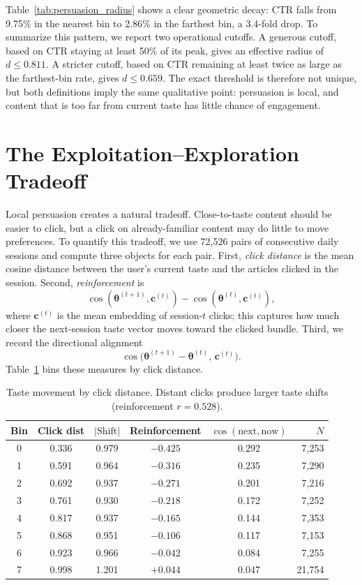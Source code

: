 \documentclass[11pt]{article}
\begin{document}
Table~\ref{tab:persuasion_radius} shows a clear geometric decay: CTR falls from 9.75\% in the nearest bin to 2.86\% in the farthest bin, a 3.4-fold drop. To summarize this pattern, we report two operational cutoffs. A generous cutoff, based on CTR staying at least 50\% of its peak, gives an effective radius of $d \leq 0.811$. A stricter cutoff, based on CTR remaining at least twice as large as the farthest-bin rate, gives $d \leq 0.659$. The exact threshold is therefore not unique, but both definitions imply the same qualitative point: persuasion is local, and content that is too far from current taste has little chance of engagement.

\section{The Exploitation--Exploration Tradeoff}
\label{sec:tradeoff}

Local persuasion creates a natural tradeoff. Close-to-taste content should be easier to click, but a click on already-familiar content may do little to move preferences. To quantify this tradeoff, we use 72,526 pairs of consecutive daily sessions and compute three objects for each pair. First, \emph{click distance} is the mean cosine distance between the user's current taste and the articles clicked in the session. Second, \emph{reinforcement} is
\[
\cos(\boldsymbol{\theta}^{(t+1)},\mathbf{c}^{(t)})-\cos(\boldsymbol{\theta}^{(t)},\mathbf{c}^{(t)}),
\]
where $\mathbf{c}^{(t)}$ is the mean embedding of session-$t$ clicks; this captures how much closer the next-session taste vector moves toward the clicked bundle. Third, we record the directional alignment
\[
\cos\!\big(\boldsymbol{\theta}^{(t+1)}-\boldsymbol{\theta}^{(t)},\,\mathbf{c}^{(t)}\big).
\]
Table~\ref{tab:movement} bins these measures by click distance.

\begin{table}[ht]
\centering
\caption{Taste movement by click distance. Distant clicks produce larger taste shifts (reinforcement $r = 0.528$).}
\label{tab:movement}
\begin{tabular}{cccccr}
\toprule
Bin & Click dist & $|\text{Shift}|$ & Reinforcement & $\cos(\text{next}, \text{now})$ & $N$ \\
\midrule
0 & 0.336 & 0.979 & $-0.425$ & 0.292 & 7,253 \\
1 & 0.591 & 0.964 & $-0.316$ & 0.235 & 7,290 \\
2 & 0.692 & 0.937 & $-0.271$ & 0.201 & 7,216 \\
3 & 0.761 & 0.930 & $-0.218$ & 0.172 & 7,252 \\
4 & 0.817 & 0.937 & $-0.165$ & 0.144 & 7,353 \\
5 & 0.868 & 0.951 & $-0.106$ & 0.117 & 7,153 \\
6 & 0.923 & 0.966 & $-0.042$ & 0.084 & 7,255 \\
7 & 0.998 & 1.201 & $+0.044$ & 0.047 & 21,754 \\
\bottomrule
\end{tabular}
\end{table}
\FloatBarrier
\end{document}
